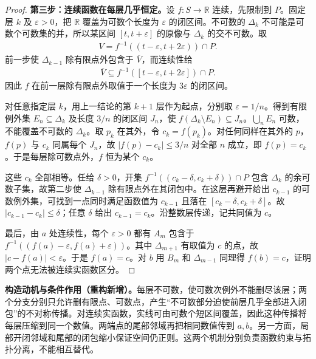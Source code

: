 \documentclass[../../main.tex]{subfiles}
\begin{document}
\begin{proof}
\textbf{第三步：连续函数在每层几乎恒定。}设 $f:S\to\mathbb R$ 连续，先限制到 $P$。固定层 $k$ 及 $\varepsilon>0$，把 $\mathbb R$ 覆盖为可数个长度为 $\varepsilon$ 的闭区间。不可数的 $\Delta_k$ 不可能是可数个可数集的并，所以某区间 $[t,t+\varepsilon]$ 的原像与 $\Delta_k$ 的交不可数。取
\begin{align*}
V=f^{-1}((t-\varepsilon,t+2\varepsilon))\cap P.
\end{align*}
前一步使 $\Delta_{k-1}$ 除有限点外包含于 $\overline V$，而连续性给
\begin{align*}
\overline V\subseteq f^{-1}([t-\varepsilon,t+2\varepsilon])\cap P.
\end{align*}
因此 $f$ 在前一层除有限点外取值于一个长度为 $3\varepsilon$ 的闭区间。

对任意指定层 $k$，用上一结论的第 $k+1$ 层作为起点，分别取 $\varepsilon=1/n$。得到有限例外集 $E_n\subseteq\Delta_k$ 及长度 $3/n$ 的闭区间 $J_n$，使 $f(\Delta_k\setminus E_n)\subseteq J_n$。$\bigcup_nE_n$ 可数，不能覆盖不可数的 $\Delta_k$。取 $p_k$ 在其外，令 $c_k=f(p_k)$。对任何同样在其外的 $p$，$f(p)$ 与 $c_k$ 同属每个 $J_n$，故 $|f(p)-c_k|\le3/n$ 对全部 $n$ 成立，即 $f(p)=c_k$。于是每层除可数点外，$f$ 恒为某个 $c_k$。

这些 $c_k$ 全部相等。任给 $\delta>0$，开集 $f^{-1}((c_k-\delta,c_k+\delta))\cap P$ 包含 $\Delta_k$ 的余可数子集，故第二步使 $\Delta_{k-1}$ 除有限点外在其闭包中。在这层再避开给出 $c_{k-1}$ 的可数例外集，可找到一点同时满足函数值为 $c_{k-1}$ 且落在 $[c_k-\delta,c_k+\delta]$。故 $|c_{k-1}-c_k|\le\delta$；任意 $\delta$ 给出 $c_{k-1}=c_k$。沿整数层传递，记共同值为 $c$。

最后，由 $a$ 处连续性，每个 $\varepsilon>0$ 都有 $A_m$ 包含于 $f^{-1}((f(a)-\varepsilon,f(a)+\varepsilon))$。其中 $\Delta_{m+1}$ 有取值为 $c$ 的点，故 $|c-f(a)|<\varepsilon$。于是 $f(a)=c$。对 $b$ 用 $B_m$ 和 $\Delta_{m-1}$ 同理得 $f(b)=c$，证明两个点无法被连续实函数区分。
\end{proof}
\begin{remark}
\textbf{构造动机与条件作用（重构新增）。}每层不可数，使可数次例外不能删尽该层；两个分支分别只允许删有限点、可数点，产生“不可数部分迫使前层几乎全部进入闭包”的不对称传播。对连续实函数，实线可由可数个短区间覆盖，因此这种传播将每层压缩到同一个数值。两端点的尾部邻域再把相同数值传到 $a,b$。另一方面，局部开闭邻域和尾部的闭包缩小保证空间仍正则。这两个机制分别负责函数约束与拓扑分离，不能相互替代。
\end{remark}
\end{document}
